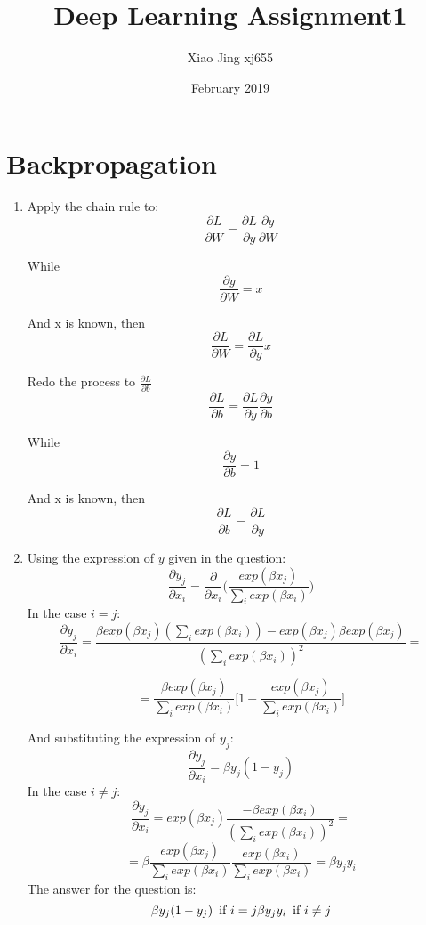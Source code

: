 \documentclass{article}
\title{Deep Learning Assignment1}
\author{Xiao Jing xj655 }
\date{February 2019}
\begin{document}
\maketitle

\section{Backpropagation}
\begin{enumerate}
\item Apply the chain rule to:
$$
\frac{\partial L}{\partial W} = \frac{\partial L}{\partial y}\frac{\partial y}{\partial W}
$$

While
$$
\frac{\partial y}{\partial W} = x
$$

And x is known, then
$$
\frac{\partial L}{\partial W} = \frac{\partial L}{\partial y} x
$$

Redo the process to $\frac{\partial L}{\partial b}$
$$
\frac{\partial L}{\partial b} = \frac{\partial L}{\partial y}\frac{\partial y}{\partial b}
$$

While
$$
\frac{\partial y}{\partial b} = 1
$$

And x is known, then
$$
\frac{\partial L}{\partial b} = \frac{\partial L}{\partial y}
$$

\item Using the expression of $y$ given in the question:
$$
\frac{\partial y_j}{\partial x_i} = \frac{\partial }{\partial x_i} \Big(  
\frac{exp(\beta x_j)}{\sum_i exp(\beta x_i)}
\Big)
$$
In the case $i=j$:
$$
\frac{\partial y_j}{\partial x_i} =    
\frac{\beta exp(\beta x_j) ({\sum_i exp(\beta x_i)})- exp(\beta x_j)\beta exp(\beta x_j)  
}
{(\sum_i exp(\beta x_i))^2}=
$$

$$
=\frac{\beta exp(\beta x_j)}{\sum_i exp(\beta x_i)} \Big[  1-\frac{exp(\beta x_j)}{\sum_i exp(\beta x_i) }\Big]
$$

And substituting the expression of $y_j$:
$$
\frac{\partial y_j}{\partial x_i} =\beta y_j (1- y_j)
$$
In the case $i\neq j$:
$$
\frac{\partial y_j}{\partial x_i} =  exp(\beta x_j)  
\frac{ -\beta exp(\beta x_i) }
{(\sum_i exp(\beta x_i))^2}=
$$ 
$$
=\beta \frac{ exp(\beta x_j)}{\sum_i exp(\beta x_i) }
\frac{ exp(\beta x_i)}{\sum_i exp(\beta x_i) } =\beta y_j y_i 
$$
The answer for the question is:
\begin{equation*}
            \beta y_j (1- y_j)    \text{\,	if  $i= j$}\\
            \beta y_j y_i   \text{\,	if  $i\neq j$}      
    

\end{equation*}

\end{enumerate}
\end{document}
